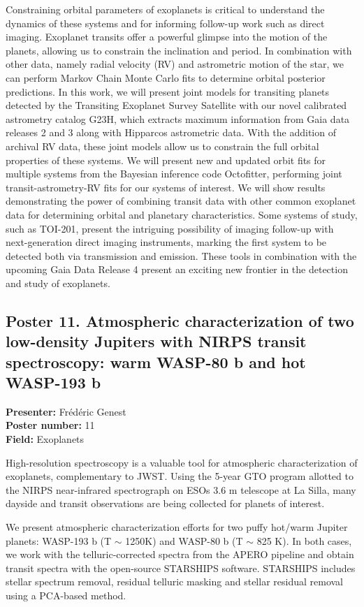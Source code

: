 Constraining orbital parameters of exoplanets is critical to understand the dynamics of these systems and for informing follow-up work such as direct imaging. Exoplanet transits offer a powerful glimpse into the motion of the planets, allowing us to constrain the inclination and period. In combination with other data, namely radial velocity (RV) and astrometric motion of the star, we can perform Markov Chain Monte Carlo fits to determine orbital posterior predictions. In this work, we will present joint models for transiting planets detected by the Transiting Exoplanet Survey Satellite with our novel calibrated astrometry catalog G23H, which extracts maximum information from Gaia data releases 2 and 3 along with Hipparcos astrometric data. With the addition of archival RV data, these joint models allow us to constrain the full orbital properties of these systems. We will present new and updated orbit fits for multiple systems from the Bayesian inference code Octofitter, performing joint transit-astrometry-RV fits for our systems of interest. We will show results demonstrating the power of combining transit data with other common exoplanet data for determining orbital and planetary characteristics. Some systems of study, such as TOI-201, present the intriguing possibility of imaging follow-up with next-generation direct imaging instruments, marking the first system to be detected both via transmission and emission. These tools in combination with the upcoming Gaia Data Release 4 present an exciting new frontier in the detection and study of exoplanets.

\hypertarget{poster-abstract-talk-42}{}\label{poster-abstract-page-talk-42}
\subsection*{Poster 11. Atmospheric characterization of two low-density Jupiters with NIRPS transit spectroscopy: warm WASP-80 b and hot WASP-193 b}
\textbf{Presenter:} Frédéric Genest\\
\textbf{Poster number:} 11\\
\textbf{Field:} Exoplanets

High-resolution spectroscopy is a valuable tool for atmospheric characterization of exoplanets, complementary to JWST. Using the 5-year GTO program allotted to the NIRPS near-infrared spectrograph on ESOs 3.6 m telescope at La Silla, many dayside and transit observations are being collected for planets of interest.

We present atmospheric characterization efforts for two puffy hot/warm Jupiter planets: WASP-193 b (T $\sim$ 1250K) and WASP-80 b (T $\sim$ 825 K). In both cases, we work with the telluric-corrected spectra from the APERO pipeline and obtain transit spectra with the open-source STARSHIPS software. STARSHIPS includes stellar spectrum removal, residual telluric masking and stellar residual removal using a PCA-based method.

